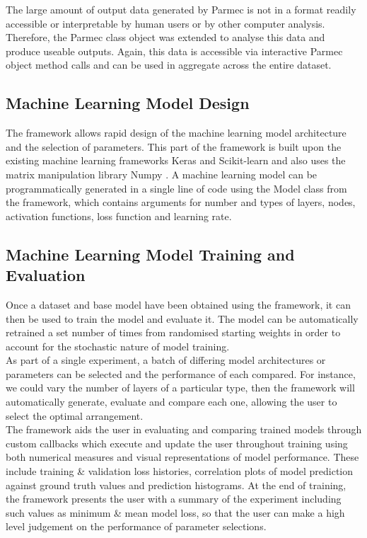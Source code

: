 \noindent
The large amount of output data generated by Parmec is not in a format readily accessible or interpretable by human users or by other computer analysis. Therefore, the Parmec class object was extended to analyse this data and produce useable outputs. Again, this data is accessible via interactive Parmec object method calls and can be used in aggregate across the entire dataset.
\\

\subsection{Machine Learning Model Design}

The framework allows rapid design of the machine learning model architecture and the selection of parameters. This part of the framework is built upon the existing machine learning frameworks Keras \cite{ketkar2017introduction} and Scikit-learn \cite{pedregosa2011scikit} and also uses the matrix manipulation library Numpy \cite{harris2020array}. A machine learning model can be programmatically generated in a single line of code using the Model class from the framework, which contains arguments for number and types of layers, nodes, activation functions, loss function and learning rate.

\subsection{Machine Learning Model Training and Evaluation}

Once a dataset and base model have been obtained using the framework, it can then be used to train the model and evaluate it.  The model can be automatically retrained a set number of times from randomised starting weights in order to account for the stochastic nature of model training. \\

\noindent 
As part of a single experiment, a batch of differing model architectures or parameters can be selected and the performance of each compared. For instance, we could vary the number of layers of a particular type, then the framework will automatically generate, evaluate  and compare each one, allowing the user to select the optimal arrangement.  \\

\noindent
The framework aids the user in evaluating and comparing trained models through custom callbacks which execute and update the user throughout training using both numerical measures and visual representations of model performance. These include training \& validation loss histories, correlation plots of model prediction against ground truth values and prediction histograms. At the end of training, the framework presents the user with a summary of the experiment  including such values as minimum \& mean model loss, so that the user can make a high level judgement on the performance of parameter selections.

